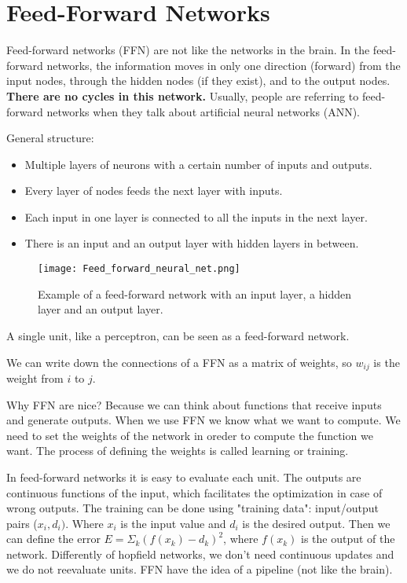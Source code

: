 \documentclass[main]{subfiles}
\begin{document}

\section{Feed-Forward Networks}

Feed-forward networks (FFN) are not like the networks in the brain.
In the feed-forward networks, the information moves in only one direction (forward) from the input nodes, through the hidden nodes (if they exist), and to the output nodes.
\textbf{There are no cycles in this network.}
Usually, people are referring to feed-forward networks when they talk about artificial neural networks (ANN).

General structure:
\begin{itemize}[noitemsep,nolistsep]
	\item Multiple layers of neurons with a certain number of inputs and outputs.
	\item Every layer of nodes feeds the next layer with inputs.
	\item Each input in one layer is connected to all the inputs in the next layer.
	\item There is an input and an output layer with hidden layers in between.
\end{itemize}

\begin{figure}[H]
	\centering
	\texttt{[image: Feed\_forward\_neural\_net.png]}
	\caption{Example of a feed-forward network with an input layer, a hidden layer and an output layer.}
\end{figure}

A single unit, like a perceptron, can be seen as a feed-forward network.

We can write down the connections of a FFN as a matrix of weights, so $w_{ij}$ is the weight from $i$ to $j$.

Why FFN are nice?
Because we can think about functions that receive inputs and generate outputs.
When we use FFN we know what we want to compute.
We need to set the weights of the network in oreder to compute the function we want.
The process of defining the weights is called learning or training.

In feed-forward networks it is easy to evaluate each unit.
The outputs are continuous functions of the input, which facilitates the optimization in case of wrong outputs.
The training can be done using "training data": input/output pairs ($x_i, d_i)$. Where $x_i$ is the input value and $d_i$ is the desired output.
Then we can define the error $E = \Sigma_k (f(x_k) - d_k)^2$, where $f(x_k)$ is the output of the network.
Differently of hopfield networks, we don't need continuous updates and we do not reevaluate units.
FFN have the idea of a pipeline (not like the brain).
\end{document}
